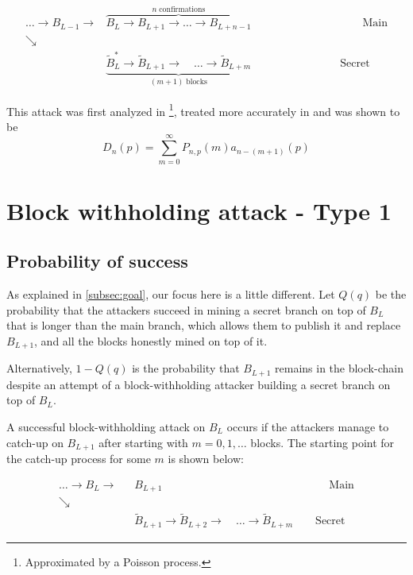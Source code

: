 \documentclass[letterpaper,12pt]{report}
\theoremstyle{plain}
\theoremstyle{definition}
\begin{document}
\begin{eqnarray}\label{dsfigure}
 \dots \rightarrow \mathit{B}_{L-1}\rightarrow &\overbrace{\mathit{B}_{L}\rightarrow\mathit{B}_{L+1}
\rightarrow\dots\rightarrow\mathit{B}_{L+n-1}}^{n \; \mathrm{confirmations}} \qquad\qquad\qquad\qquad\qquad \mathrm{Main}\\\nonumber
\searrow & \\\nonumber
\qquad \qquad \qquad & \underbrace{\widetilde{\mathit{B}}_{L}^{*}\rightarrow\widetilde{\mathit{B}}_{L+1}
\longrightarrow \quad \dots \longrightarrow\widetilde{\mathit{B}}_{L+m}}_{(m+1)\; \mathrm{ blocks}}\qquad\qquad\qquad\qquad \mathrm{Secret}
\end{eqnarray}

This attack was first analyzed in \cite{Bitcoin} \footnote{Approximated by a Poisson process.}, treated more accurately in \cite{Doublespend} and was shown to be 
\begin{equation}\label{eqn:ds}
D_n(p)=\sum_{m=0}^{\infty}P_{n,p}(m)\mathit{a}_{n-(m+1)}(p)
\end{equation}

\section{Block withholding attack - Type 1}

\subsection{Probability of success}\label{probabilityofsuccess}

As explained in \ref{subsec:goal}, our focus here is a little different. 
Let $\mathit{Q}(q)$  be the probability that the attackers succeed in mining a secret branch on top of $\mathit{B}_L$ that is longer than the main branch, which allows them to publish it and replace $\mathit{B}_{L+1}$, and all the blocks honestly mined on top of it. 

Alternatively, $1-\mathit{Q}(q)$ is the probability that $\mathit{B}_{L+1}$ remains in the block-chain despite an attempt of a block-withholding attacker building a secret branch on top of $\mathit{B}_L$.

A successful block-withholding attack on $\mathit{B}_L$ occurs if the attackers manage to catch-up on $B_{L+1}$ after starting with $m=0,1,\dots$ blocks. The starting point for the catch-up process for some $m$ is shown below:

\begin{eqnarray}\label{blockwithholdingboundary}
 \dots \rightarrow \mathit{B}_L\rightarrow &\mathit{B}_{L+1} \qquad\qquad\qquad\qquad\qquad\qquad\qquad\quad \mathrm{Main}\\\nonumber
\searrow & \\\nonumber
\qquad \qquad \qquad & \widetilde{\mathit{B}}_{L+1}\rightarrow\widetilde{\mathit{B}}_{L+2}
\longrightarrow \quad \dots \longrightarrow\widetilde{\mathit{B}}_{L+m}\qquad \mathrm{Secret}
\end{eqnarray}
\end{document}
